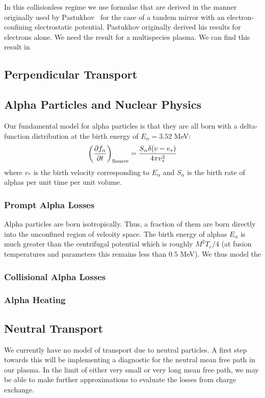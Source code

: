 \documentclass{revtex4}
\begin{document}
In this collisionless regime we use formulae that are derived in the manner originally used by Pastukhov~\cite{Pastukhov1974} for the case of a tandem mirror with an electron-confining electrostatic potential. Pastukhov originally derived his results for electrons alone. We need the result for a multispecies plasma.  We can find this result in 

\subsection{Perpendicular Transport}

\subsection{Alpha Particles and Nuclear Physics}
Our fundamental model for alpha particles is that they are all born with a delta-function distribution at the birth energy of $E_\alpha = 3.52$ MeV:
\begin{equation}
\left(  \frac{\partial f_\alpha} {\partial t} \right)_{\mathrm{Source}} = \frac{S_\alpha \delta(v-v_*)}{4\pi v_*^2}
\end{equation}
where $v_*$ is the birth velocity corresponding to $E_\alpha$ and $S_\alpha$ is the birth rate of alphas per unit time per unit volume.
\subsubsection{Prompt Alpha Losses}
Alpha particles are born isotropically. Thus, a fraction of them are born directly into the unconfined region of velcoity space.
The birth energy of alphas $E_\alpha$ is much greater than the centrifugal potential which is roughly $M^2 T_e / 4$ (at fusion temperatures and parameters this remains
less than $0.5$ MeV). We thus model the 
\subsubsection{Collisional Alpha Losses}
\subsubsection{Alpha Heating}

\subsection{Neutral Transport}
We currently have no model of transport due to neutral particles. A first step towards this will be implementing a diagnostic for 
the neutral mean free path in our plasma. In the limit of either very small or very long mean free path, we may be able to make further approximations to evaluate the 
losses from charge exchange.
\end{document}
